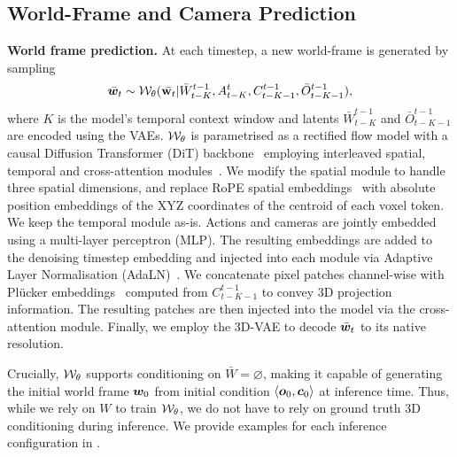 \documentclass{article}
\theoremstyle{plain}
\theoremstyle{definition}
\theoremstyle{remark}
\begin{document}
\subsection{World-Frame and Camera Prediction}

\textbf{World frame prediction.} At each timestep, a new world-frame is generated by sampling 
\begin{equation}
  \bar{{\bm{w}}}_t \sim {\mathcal{W}}_\theta(\bar{{\mathbf{w}}_t} | \bar{W}^{t-1}_{t-K}, A^t_{t-K}, C^{t-1}_{t-K-1}, \bar{O}^{t-1}_{t-K-1}),  
\end{equation}
where $K$ is the model's temporal context window and latents $\bar{W}^{t-1}_{t-K}$ and $\bar{O}^{t-1}_{t-K-1}$ are encoded using the VAEs. 
${\mathcal{W}}_\theta$ is parametrised as a rectified flow model with a causal Diffusion Transformer (DiT) backbone~\citep{peebles2023scalable} employing interleaved spatial, temporal and cross-attention modules~\citep{decart2024oasis}.
We modify the spatial module to handle three spatial dimensions, and replace RoPE spatial embeddings~\citep{su2024roformer} with absolute position embeddings of the XYZ coordinates of the centroid of each voxel token.
We keep the temporal module as-is.
Actions and cameras are jointly embedded using a multi-layer perceptron (MLP).
The resulting embeddings are added to the denoising timestep embedding and injected into each module via Adaptive Layer Normalisation (AdaLN)~\citep{peebles2023scalable}. We concatenate pixel patches channel-wise with Pl\"ucker embeddings~\citep{xiao2025worldmem,sitzmann2021light} computed from $C^{t-1}_{t-K-1}$ to convey 3D projection information. The resulting patches are then injected into the model via the cross-attention module.
Finally, we employ the 3D-VAE to decode $\bar{{\bm{w}}}_t$ to its native resolution.

Crucially, ${\mathcal{W}}_\theta$ supports conditioning on $\bar{W}=\varnothing$, making it capable of generating the initial world frame ${\bm{w}}_0$ from initial condition $\langle {\bm{o}}_0, {\bm{c}}_0 \rangle$ at inference time.
Thus, while we rely on $W$ to train ${\mathcal{W}}_\theta$, we do not have to rely on ground truth 3D conditioning during inference. We provide examples for each inference configuration in .
\end{document}
